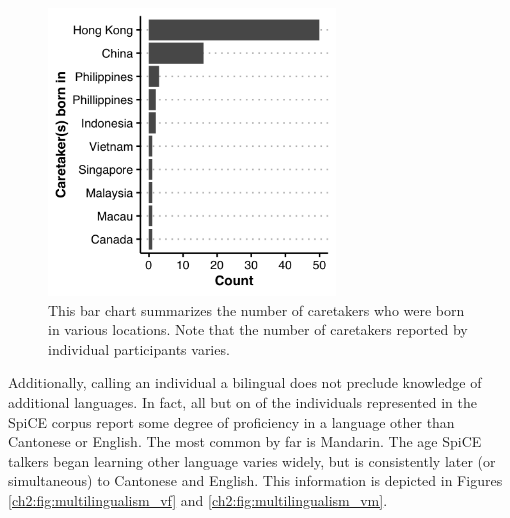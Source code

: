 \begin{figure}[!htbp]
  \begin{center}
  \includegraphics[width=3in]{figures/ch2_caretakers_3in.png} 
  \caption{This bar chart summarizes the number of caretakers who were born in various locations. Note that the number of caretakers reported by individual participants varies.}
  \label{ch2:fig:caretakers}
  \end{center}
\end{figure}

Additionally, calling an individual a bilingual does not preclude knowledge of additional languages. In fact, all but on of the individuals represented in the SpiCE corpus report some degree of proficiency in a language other than Cantonese or English. The most common by far is Mandarin. The age SpiCE talkers began learning other language varies widely, but is consistently later (or simultaneous) to Cantonese and English. This information is depicted in Figures \ref{ch2:fig:multilingualism_vf} and \ref{ch2:fig:multilingualism_vm}.

